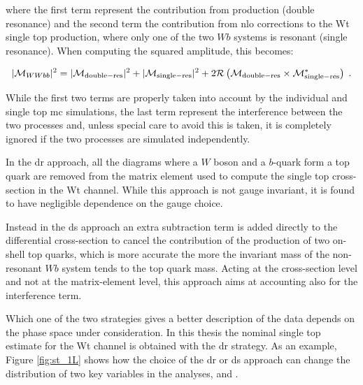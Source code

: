 \noindent where the first term represent the contribution from \ttbar production (double resonance) and the second term the contribution from 
\gls{nlo} corrections to the Wt single top production, where only one of the two $Wb$ systems is resonant (single resonance). 
When computing the squared amplitude, this becomes:

\begin{equation}
|\mathcal{M}_{WWbb}|^2 = |\mathcal{M}_{\rm{double-res}}|^2 + |\mathcal{M}_{\rm{single-res}}|^2 + 2 \mathcal{R}\left(\mathcal{M}_{\rm{double-res}}\times \mathcal{M}_{\rm{single-res}}^* \right) \; .
\end{equation}

While the first two terms are properly taken into account by the individual \ttbar and single top \gls{mc} simulations, 
the last term represent the interference between the two processes and, unless special care to avoid this is taken, it is completely ignored if the two processes are simulated independently. 

In the \gls{dr} approach, all the diagrams where a $W$ boson and a $b$-quark form a top quark are removed from the matrix element used to compute the single top cross-section in the Wt channel. While this approach is not gauge invariant, it is found to have negligible dependence on the gauge choice.

Instead in the \gls{ds} approach an extra subtraction term is added directly to the differential cross-section to cancel the contribution of the 
production of two on-shell top quarks, which is more accurate the more the invariant mass of the non-resonant $Wb$ system tends to the top quark mass. 
Acting at the cross-section level and not at the matrix-element level, this approach aims at accounting also for the interference term. 

Which one of the two strategies gives a better description of the data depends on the phase space under consideration. 
In this thesis the nominal single top estimate for the Wt channel is obtained with the \gls{dr} strategy. 
As an example, Figure \ref{fig:st_1L} shows how the choice of the \gls{dr} or \gls{ds} approach can change the distribution of two key variables 
in the analyses, \met and \mtb. 

